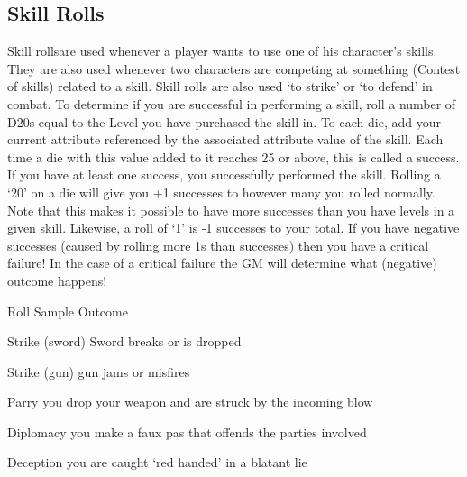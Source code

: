 \documentclass[twoside]{book}
\begin{document}
\subsection{Skill Rolls}
     Skill rollsare used whenever a player wants to use
               one of his character's skills. They are also used
               whenever two characters are competing at something
               (Contest of skills) related to a skill. Skill rolls are
               also used `to strike' or `to
               defend' in combat.  To determine if you are successful in performing a
               skill, roll a number of D20s equal to the Level you have
               purchased the skill in. To each die, add your current
               attribute referenced by the associated attribute value of
               the skill. Each time a die with this value added to it
               reaches 25 or above, this is called a success. If you have
               at least one success, you successfully performed the
               skill. Rolling a `20' on a die will give you
               +1 successes to however many you rolled normally. Note
               that this makes it possible to have more successes than
               you have levels in a given skill. Likewise, a roll of
               `1' is -1 successes to your total. If you have
               negative successes (caused by rolling more 1s than
               successes) then you have a critical failure! In the case
               of a critical failure the GM will determine what
               (negative) outcome happens!   
                
                  
                   Roll   
                   Sample Outcome   
                  
                  
                   Strike (sword)   
                   Sword breaks or is dropped   
                  
                  
                   Strike (gun)   
                   gun jams or misfires   
                  
                  
                   Parry   
                     you drop your weapon and are struck by the
                     incoming blow 
                  
                  
                   Diplomacy   
                     you make a faux pas that offends the parties
                     involved 
                  
                  
                   Deception   
                     you are caught `red handed' in a
                     blatant lie 
                  
\end{document}
